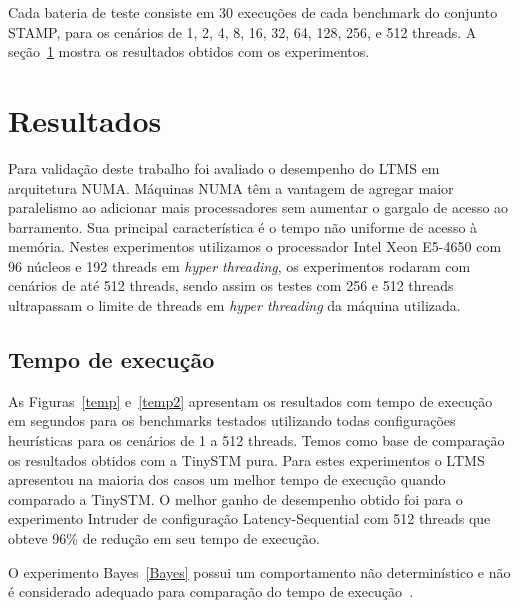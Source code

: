 \documentclass[diss,capa]{texufpel}
\begin{document}
Cada bateria de teste consiste em 30 execuções de cada benchmark do conjunto STAMP, para os cenários de 1, 2, 4, 8, 16, 32, 64, 128, 256, e 512 threads. A seção~\ref{resultados} mostra os resultados obtidos com os experimentos.

\section{Resultados}
\label{resultados}

Para validação deste trabalho foi avaliado o desempenho do LTMS em arquitetura NUMA. Máquinas NUMA têm a vantagem de agregar maior paralelismo ao adicionar mais processadores sem aumentar o gargalo de acesso ao barramento. Sua principal característica é o tempo não uniforme de acesso à memória. Nestes experimentos utilizamos o processador Intel Xeon E5-4650 com 96 núcleos e 192 threads em \emph{hyper threading}, os experimentos rodaram com cenários de até 512 threads, sendo assim os testes com 256 e 512 threads ultrapassam o limite de threads em \emph{hyper threading} da máquina utilizada.

\subsection{Tempo de execução}

As Figuras~\ref{temp} e~\ref{temp2} apresentam os resultados com tempo de execução em segundos para os benchmarks testados utilizando todas configurações heurísticas para os cenários de 1 a 512 threads. Temos como base de comparação os resultados obtidos com a TinySTM pura. Para estes experimentos o LTMS apresentou na maioria dos casos um melhor tempo de execução quando comparado a TinySTM. O melhor ganho de desempenho obtido foi para o experimento Intruder de configuração Latency-Sequential com 512 threads que obteve 96\% de redução em seu tempo de execução.

O experimento Bayes~\ref{Bayes} possui um comportamento não determinístico e não é considerado adequado para comparação do tempo de execução~\cite{Ruan:2014}.

\end{document}
